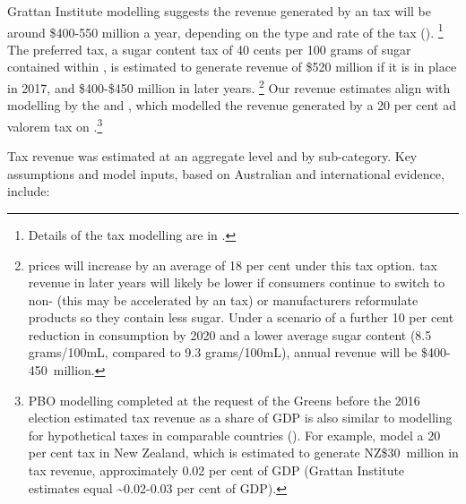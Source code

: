 \documentclass[embargoed]{grattan}
\begin{document}
Grattan Institute modelling suggests the revenue generated by an \SSB{} tax will be around \$400-550 million a year, depending on the type and rate of the tax ().%
\footnote{Details of the \SSB{} tax modelling are in .} The preferred tax, a sugar content tax of 40 cents per 100 grams of sugar contained within \SSBs{}, is estimated to generate revenue of \$520 million if it is in place in 2017, and \$400-\$450 million in later years.%
\footnote{\SSB{} prices will increase by an average of 18 per cent under this \SSB{} tax option.
\SSB{} tax revenue in later years will likely be lower if consumers continue to switch to non-\SSBs{} (this may be accelerated by an \SSB{} tax) or \SSB{} manufacturers reformulate products so they contain less sugar.
Under a scenario of a further 10 per cent reduction in \SSB{} consumption by 2020 and a lower average sugar content (8.5 grams/100mL, compared to 9.3 grams/100mL), annual revenue will be \$400-450~million.} Our revenue estimates align with modelling by the \textcite{Office2016PolicycostingAustralian} and \textcite{Veerman2016ImpactTaxSugar}, which modelled the revenue generated by a 20 per cent ad valorem tax on \SSBs{}.\footnote{PBO modelling completed at the request of the Greens before the 2016 election estimated tax revenue as a share of GDP is also similar to modelling for hypothetical taxes in comparable countries (\textcites{Andreyeva2011Estimatingpotentialtaxes}{Briggs2013Overallincomespecific}). For example, \textcite{Mhurchu2007Nutritionlabelsclaims} model a 20 per cent \SSB{} tax in New Zealand, which is estimated to generate NZ\$30~million in tax revenue, approximately 0.02 per cent of GDP (Grattan Institute estimates equal \textasciitilde{}0.02-0.03 per cent of GDP).}

Tax revenue was estimated at an aggregate level and by \SSB{} sub-category.
Key assumptions and model inputs, based on Australian and international evidence, include:
\end{document}
